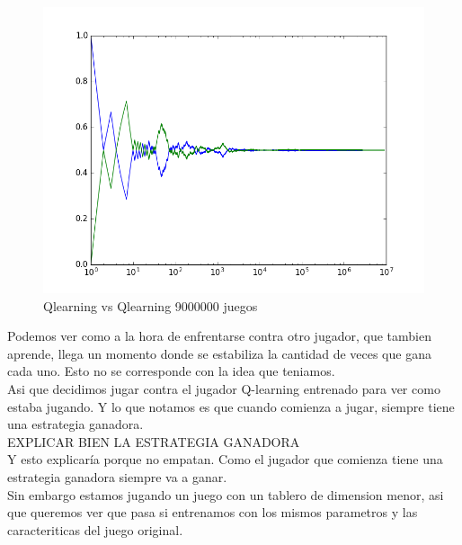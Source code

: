 \begin{figure}[h]
 \centering
 \begin{minipage}{.45\textwidth}
	\centering
	\includegraphics[scale=0.35]{img/QlearningQlearningEgreedy9000000.png}
        \caption{Qlearning vs Qlearning 9000000 juegos}
  \end{minipage}
\end{figure}


Podemos ver como a la hora de enfrentarse contra otro jugador, que tambien aprende, llega un momento donde se estabiliza la
 cantidad de veces que gana cada uno. Esto no se corresponde con la idea que teniamos. \\

Asi que decidimos jugar contra el jugador Q-learning entrenado para ver como estaba jugando. Y lo que notamos es que cuando comienza
 a jugar, siempre tiene una estrategia ganadora.\\
{\huge EXPLICAR BIEN LA ESTRATEGIA GANADORA}\\

Y esto explicaría porque no empatan. Como el jugador que comienza tiene una estrategia ganadora siempre va a ganar.\\


Sin embargo estamos jugando un juego con un tablero de dimension menor, asi que queremos ver que pasa si entrenamos con los mismos
 parametros y las caracteriticas del juego original.


